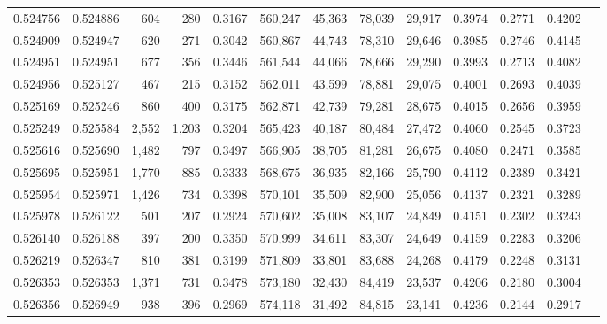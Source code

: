 \begin{tabular}{rrrrrrrrrrrrr}
0.524756 & 0.524886 &    604 &   280 &                                     0.3167 & 560,247 &  45,363 &  78,039 &  29,917 & 0.3974 & 0.2771 & 0.4202 \\
0.524909 & 0.524947 &    620 &   271 &                                     0.3042 & 560,867 &  44,743 &  78,310 &  29,646 & 0.3985 & 0.2746 & 0.4145 \\
0.524951 & 0.524951 &    677 &   356 &                                     0.3446 & 561,544 &  44,066 &  78,666 &  29,290 & 0.3993 & 0.2713 & 0.4082 \\
0.524956 & 0.525127 &    467 &   215 &                                     0.3152 & 562,011 &  43,599 &  78,881 &  29,075 & 0.4001 & 0.2693 & 0.4039 \\
0.525169 & 0.525246 &    860 &   400 &                                     0.3175 & 562,871 &  42,739 &  79,281 &  28,675 & 0.4015 & 0.2656 & 0.3959 \\
0.525249 & 0.525584 &  2,552 & 1,203 &                                     0.3204 & 565,423 &  40,187 &  80,484 &  27,472 & 0.4060 & 0.2545 & 0.3723 \\
0.525616 & 0.525690 &  1,482 &   797 &                                     0.3497 & 566,905 &  38,705 &  81,281 &  26,675 & 0.4080 & 0.2471 & 0.3585 \\
0.525695 & 0.525951 &  1,770 &   885 &                                     0.3333 & 568,675 &  36,935 &  82,166 &  25,790 & 0.4112 & 0.2389 & 0.3421 \\
0.525954 & 0.525971 &  1,426 &   734 &                                     0.3398 & 570,101 &  35,509 &  82,900 &  25,056 & 0.4137 & 0.2321 & 0.3289 \\
0.525978 & 0.526122 &    501 &   207 &                                     0.2924 & 570,602 &  35,008 &  83,107 &  24,849 & 0.4151 & 0.2302 & 0.3243 \\
0.526140 & 0.526188 &    397 &   200 &                                     0.3350 & 570,999 &  34,611 &  83,307 &  24,649 & 0.4159 & 0.2283 & 0.3206 \\
0.526219 & 0.526347 &    810 &   381 &                                     0.3199 & 571,809 &  33,801 &  83,688 &  24,268 & 0.4179 & 0.2248 & 0.3131 \\
0.526353 & 0.526353 &  1,371 &   731 &                                     0.3478 & 573,180 &  32,430 &  84,419 &  23,537 & 0.4206 & 0.2180 & 0.3004 \\
0.526356 & 0.526949 &    938 &   396 &                                     0.2969 & 574,118 &  31,492 &  84,815 &  23,141 & 0.4236 & 0.2144 & 0.2917 \\

\end{tabular}
